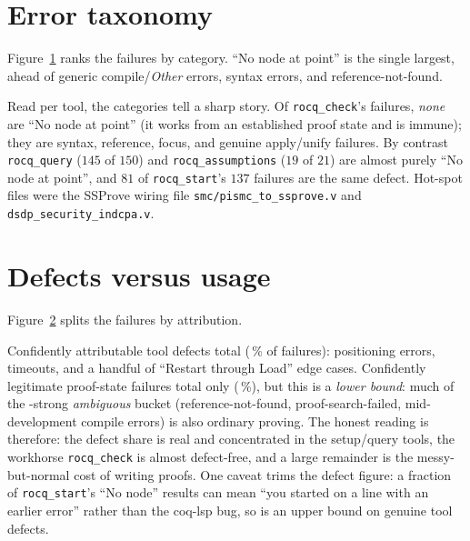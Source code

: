 \documentclass[11pt]{article}
\newcommand{\tl}[1]{\texttt{#1}}
\newcommand{\rstart}{\tl{rocq\_start}}
\newcommand{\rcheck}{\tl{rocq\_check}}
\newcommand{\rquery}{\tl{rocq\_query}}
\newcommand{\rassum}{\tl{rocq\_assumptions}}
\begin{document}
\section{Error taxonomy}\label{sec:err}
Figure~\ref{fig:errbar} ranks the \Nfail{} failures by category. ``No node at
point'' is the single largest, ahead of generic compile/\emph{Other} errors,
syntax errors, and reference-not-found.

\begin{figure}[h]\centering
{}
\label{fig:errbar}
\end{figure}

\noindent Read per tool, the categories tell a sharp story. Of \rcheck's
failures, \emph{none} are ``No node at point'' (it works from an established proof
state and is immune); they are syntax, reference, focus, and genuine
apply/unify failures. By contrast \rquery{} (\(145\) of \(150\)) and \rassum{}
(\(19\) of \(21\)) are almost purely ``No node at point'', and \(81\) of \rstart's
\(137\) failures are the same defect. Hot-spot files were the SSProve wiring file
\texttt{smc/pismc\_to\_ssprove.v} and \texttt{dsdp\_security\_indcpa.v}.

\section{Defects versus usage}
Figure~\ref{fig:failpie} splits the failures by attribution.

\begin{figure}[h]\centering
\ChartFailPie
{}\label{fig:failpie}
\end{figure}

\noindent Confidently attributable tool defects total \Ftooldefect{}
(\Ftooldefectpct\,\% of failures): \Nnode{} positioning errors, \Ntimeout{}
timeouts, and a handful of ``Restart through Load'' edge cases. Confidently
legitimate proof-state failures total only \Flegit{} (\Flegitpct\,\%), but this is
a \emph{lower bound}: much of the \Fambig-strong \emph{ambiguous} bucket
(reference-not-found, proof-search-failed, mid-development compile errors) is also
ordinary proving. The honest reading is therefore: the defect share is real and
concentrated in the setup/query tools, the workhorse \rcheck{} is almost
defect-free, and a large remainder is the messy-but-normal cost of writing proofs.
One caveat trims the defect figure: a fraction of \rstart's ``No node'' results can
mean ``you started on a line with an earlier error'' rather than the coq-lsp bug,
so \Ftooldefect{} is an upper bound on genuine tool defects.
\end{document}
